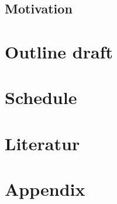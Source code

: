 \documentclass[12pt, a4paper]{article}
\begin{document}
\subsection{Motivation}
\section{Outline draft}
\section{Schedule}
\section{Literatur}


\newpage

\renewcommand{\thesubsection}{\Alph{subsection}}
\setcounter{page}{\value{lastroman}}
\section*{Appendix}
\listoffigures

\end{document}
